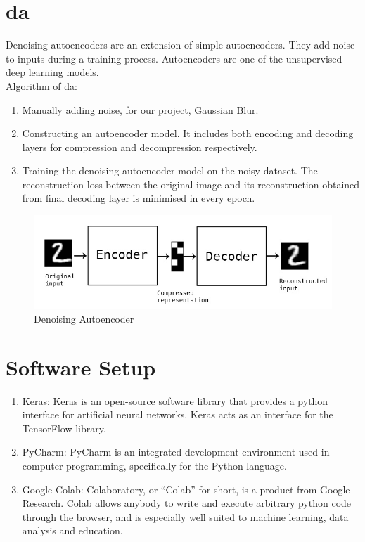 \section{\gls{da}}
Denoising autoencoders are an extension of simple autoencoders.  They add noise to inputs during a training process. Autoencoders are one of the unsupervised deep learning models. \cite{yasenko2020image} \\
Algorithm of \acrshort{da}:
\begin{enumerate}
    \item Manually adding noise, for our project, Gaussian Blur.
    \item Constructing an autoencoder model. It includes both encoding and decoding layers for compression and decompression respectively.
    \item Training the denoising autoencoder model on the noisy dataset. The reconstruction loss between the original image and its reconstruction obtained from final decoding layer is minimised in every epoch.
\end{enumerate}

\begin{figure}[htb]
\centering
	\includegraphics[scale=2.5]{Figures/autoencoder_schema}	
	\caption{Denoising Autoencoder}
	\label{fig:autoencoder_schema}
\end{figure}
\section{Software Setup}
\begin{enumerate}
\item Keras: Keras is an open-source software library that provides a python interface for artificial neural networks. Keras acts as an interface for the TensorFlow library.
\item PyCharm: PyCharm is an integrated development environment used in computer programming, specifically for the Python language.
\item Google Colab: Colaboratory, or “Colab” for short, is a product from Google Research. Colab allows anybody to write and execute arbitrary python code through the browser, and is especially well suited to machine learning, data analysis and education.
\end{enumerate}
